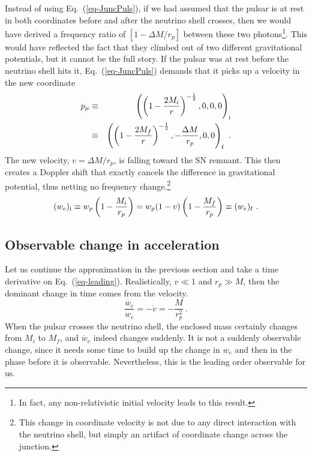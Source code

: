 \documentclass[aps,showpacs,twocolumn,floats,prd,superscriptaddress,nofootinbib]{revtex4}
\begin{document}
Instead of using Eq.~(\ref{eq-JuncPuls}), if we had assumed that the pulsar is at rest in both coordinates before and after the neutrino shell crosses, then we would have derived a frequency ratio of $[1-\Delta M/r_p]$ between these two photons\footnote{In fact, any non-relativistic initial velocity leads to this result.}. This would have reflected the fact that they climbed out of two different gravitational potentials, but it cannot be the full story. If the pulsar was at rest before the neutrino shell hits it, Eq.~(\ref{eq-JuncPuls}) demands that it picks up a velocity in the new coordinate
 \begin{eqnarray}
p_\mu &\equiv& \left( \left( 1 - \frac{2M_i}{r} \right)^{-\frac{1}{2}}, 0, 0,0\right)_{\rm i} 
\label{eq-PulsarRest} \\ \nonumber  &\equiv&	
\left( \left( 1 - \frac{2M_f}{r} \right)^{-\frac{1}{2}}, -\frac{\Delta M}{r_p},0,0 \right)_{\rm f}~.
\end{eqnarray}
The new velocity, $v=\Delta M/r_p$, is falling toward the SN remnant. This then creates a Doppler shift that exactly cancels the difference in gravitational potential, thus netting no frequency change.\footnote{This change in coordinate velocity is not due to any direct interaction with the neutrino shell, but simply an artifact of coordinate change across the junction.}
\begin{equation}
(w_e)_{\rm i} \equiv w_p \left(1-\frac{M_i}{r_p}\right) = 
w_p (1-v)\left(1-\frac{M_f}{r_p}\right) \equiv (w_e)_{\rm f}~.
\label{eq-leading}
\end{equation}

\subsection{Observable change in acceleration}
\label{sec-acceleration}

Let us continue the approximation in the previous section and take a time derivative on Eq.~(\ref{eq-leading}). Realistically, $v \ll1$ and $r_p\gg M$, then the dominant change in time comes from the velocity.
\begin{equation}
\frac{\dot{w_e}}{w_e} = -\dot{v} = -\frac{M}{r_p^2}~.
\label{eq-AccChange}
\end{equation}
When the pulsar crosses the neutrino shell, the enclosed mass certainly changes from $M_i$ to $M_f$, and $\dot{w_e}$ indeed changes suddenly. It is not a suddenly observable change, since it needs some time to build up the change in $w_e$ and then in the phase before it is observable. Nevertheless, this is the leading order observable for us.
\end{document}

